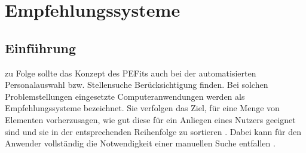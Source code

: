 
\chapter{Empfehlungssysteme}
\label{ch:empfehlungssysteme}

\section{Einführung}
\label{ch:empfehlungssysteme:einfuehrung}
\textcite[S. 1ff.]{malinowski:2006} zu Folge sollte das Konzept des \acp{PEFit} auch bei der automatisierten Personalauswahl bzw. Stellensuche Berücksichtigung finden. Bei solchen Problemstellungen eingesetzte Computeranwendungen werden als Empfehlungssysteme bezeichnet. Sie verfolgen das Ziel, für eine Menge von Elementen vorherzusagen, wie gut diese für ein Anliegen eines Nutzers geeignet sind und sie in der entsprechenden Reihenfolge zu sortieren \cite[S. 3]{recommenderSystems:2016}. Dabei kann für den Anwender vollständig die Notwendigkeit einer manuellen Suche entfallen \cite[S. 1]{comibingCareer:2013}. 


